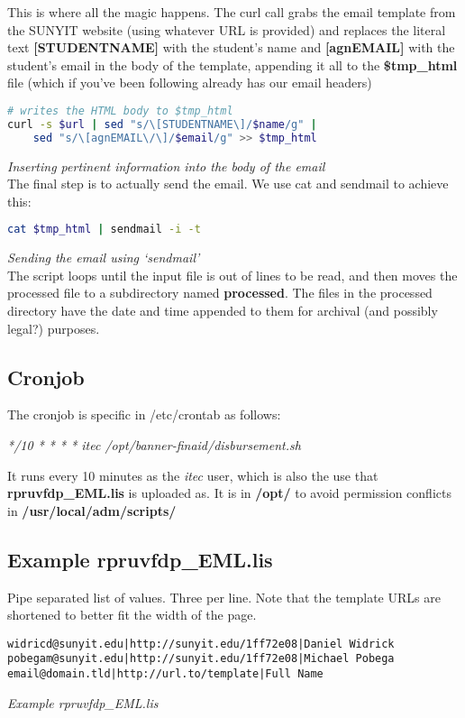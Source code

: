 \documentclass[a4paper]{article}
\begin{document}
This is where all the magic happens. The curl call grabs the email template from the SUNYIT website (using whatever URL is provided) and  replaces the literal text \textbf{[STUDENTNAME]} with the student's name and \textbf{[agnEMAIL]} with the student's email in the body of the template, appending it all to the \textbf{\$tmp\_html} file (which if you've been following already has our email headers)
\begin{lstlisting}[language=bash]
# writes the HTML body to $tmp_html
curl -s $url | sed "s/\[STUDENTNAME\]/$name/g" |
	sed "s/\[agnEMAIL\/\]/$email/g" >> $tmp_html
\end{lstlisting}
\hfill\textit{Inserting pertinent information into the body of the email}\\

The final step is to actually send the email. We use cat and sendmail to achieve this:
\begin{lstlisting}[language=bash]
    cat $tmp_html | sendmail -i -t
\end{lstlisting}
\hfill\textit{Sending the email using `sendmail'}\\

The script loops until the input file is out of lines to be read, and then moves the processed file to a subdirectory named \textbf{processed}. The files in the processed directory have the date and time appended to them for archival (and possibly legal?) purposes.

\subsection{Cronjob}
The cronjob is specific in /etc/crontab as follows:
\begin{center}
	\textit{*/10	*	*	*	*	itec	/opt/banner-finaid/disbursement.sh}
\end{center}

It runs every 10 minutes as the \textit{itec} user, which is also the use that \textbf{rpruvfdp\_EML.lis} is uploaded as. It is in \textbf{/opt/} to avoid permission conflicts in \textbf{/usr/local/adm/scripts/}

\subsection{Example rpruvfdp\_EML.lis}

Pipe separated list of values. Three per line. Note that the template URLs are shortened to better fit the width of the page.\\
\begin{lstlisting}
widricd@sunyit.edu|http://sunyit.edu/1ff72e08|Daniel Widrick
pobegam@sunyit.edu|http://sunyit.edu/1ff72e08|Michael Pobega
email@domain.tld|http://url.to/template|Full Name
\end{lstlisting}
\hfill\textit{Example rpruvfdp\_EML.lis}\\
\end{document}
